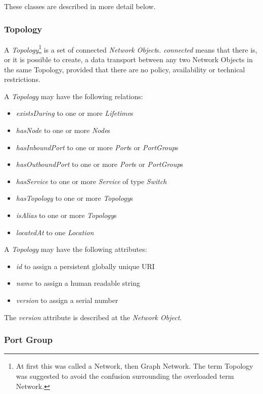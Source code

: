 These classes are described in more detail below.



\subsubsection{Topology}%
\label{class:topology}

A \emph{Topology}\footnote{At first this was called a Network, then Graph Network. The term Topology was suggested to avoid the confusion surrounding the overloaded term Network.} is a set of connected \emph{Network Object}s. \emph{connected} means that there is, or it is possible to create, a data transport between any two Network Objects in the same Topology, provided that there are no policy, availability or technical restrictions.

A \emph{Topology} may have the following relations:
\begin{itemize}
    \item \emph{existsDuring} to one or more \emph{Lifetime}s
    \item \emph{hasNode} to one or more \emph{Node}s
    \item \emph{hasInboundPort} to one or more \emph{Port}s or \emph{PortGroup}s
    \item \emph{hasOutboundPort} to one or more \emph{Port}s or \emph{PortGroup}s
    \item \emph{hasService} to one or more \emph{Service} of type \emph{Switch}
    \item \emph{hasTopology} to one or more \emph{Topology}s
    \item \emph{isAlias} to one or more \emph{Topology}s
    \item \emph{locatedAt} to one \emph{Location} 
\end{itemize}

A \emph{Topology} may have the following attributes:
\begin{itemize}
    \item \emph{id} to assign a persistent globally unique URI
    \item \emph{name} to assign a human readable string
    \item \emph{version} to assign a serial number
\end{itemize}

The \emph{version} attribute is described at the \emph{Network Object}.


\subsubsection{Port Group}%
\label{class:port_group}

